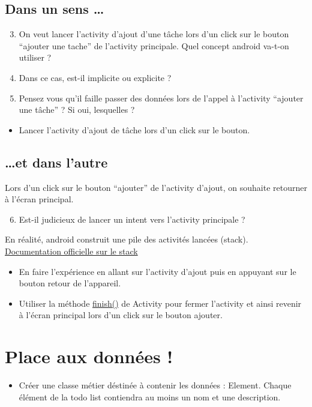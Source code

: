 \documentclass{article}
\begin{document}
\subsection{Dans un sens \ldots}
\begin{enumerate}
 \setcounter{enumi}{2}
\item On veut lancer l'activity d'ajout d'une tâche lors d'un click sur le
bouton ``ajouter une tache'' de l'activity principale.
Quel concept android va-t-on utiliser ?
\item Dans ce cas, est-il implicite ou explicite ?
\item Pensez vous qu'il faille passer des données lors de l'appel à l'activity ``ajouter une tâche'' ? Si oui, lesquelles ?
\end{enumerate}
\begin{itemize}
  \item Lancer l'activity d'ajout de tâche lors d'un click sur le bouton.
\end{itemize}
\subsection{\ldots et dans l'autre}

Lors d'un click sur le bouton ``ajouter'' de l'activity d'ajout, on souhaite retourner à l'écran principal.
 \begin{enumerate}
 \setcounter{enumi}{5}
\item Est-il judicieux de lancer un intent vers l'activity principale ? 
\end{enumerate}
 En réalité, android construit une pile des activités lancées (stack). \href{http://developer.android.com/guide/components/tasks-and-back-stack.html}{Documentation officielle sur le stack} 
  \begin{itemize}
  \item En faire l'expérience en allant sur l'activity d'ajout puis en appuyant
  sur le bouton retour de l'appareil.
  \item Utiliser la méthode
  \href{http://developer.android.com/reference/android/app/Activity.html#finish()}{finish()} de Activity pour fermer l'activity et ainsi revenir à l'écran principal lors d'un click sur le bouton ajouter.
 \end{itemize}
 
 \section{Place aux données !}
 \begin{itemize}
  \item Créer une classe métier déstinée à contenir les données : Element.
  Chaque élément de la todo list contiendra au moins un nom et une description.
 \end{itemize}
\end{document}
